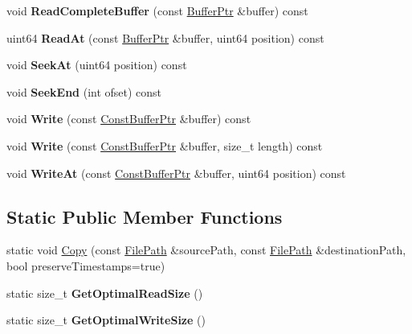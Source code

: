 \begin{DoxyCompactItemize}
void {\bfseries Read\+Complete\+Buffer} (const \hyperlink{class_gost_crypt_1_1_buffer_ptr}{Buffer\+Ptr} \&buffer) const
\item 
\mbox{\label{class_gost_crypt_1_1_file_ae2c6edb5db50a713be646a93275e07f1}} 
uint64 {\bfseries Read\+At} (const \hyperlink{class_gost_crypt_1_1_buffer_ptr}{Buffer\+Ptr} \&buffer, uint64 position) const
\item 
\mbox{\label{class_gost_crypt_1_1_file_ab758399ba66aaabe579f91941df9c4a4}} 
void {\bfseries Seek\+At} (uint64 position) const
\item 
\mbox{\label{class_gost_crypt_1_1_file_ad9b03bafa2dc71bfbc336ba47ab39563}} 
void {\bfseries Seek\+End} (int ofset) const
\item 
\mbox{\label{class_gost_crypt_1_1_file_a54ade5acfa6a39a7ee1a228a21a62127}} 
void {\bfseries Write} (const \hyperlink{class_gost_crypt_1_1_const_buffer_ptr}{Const\+Buffer\+Ptr} \&buffer) const
\item 
\mbox{\label{class_gost_crypt_1_1_file_a2c4b03b9e9aa46b0893b72a49d83719f}} 
void {\bfseries Write} (const \hyperlink{class_gost_crypt_1_1_const_buffer_ptr}{Const\+Buffer\+Ptr} \&buffer, size\+\_\+t length) const
\item 
\mbox{\label{class_gost_crypt_1_1_file_a08c967dac3fea5e47c5eaed62cc53b34}} 
void {\bfseries Write\+At} (const \hyperlink{class_gost_crypt_1_1_const_buffer_ptr}{Const\+Buffer\+Ptr} \&buffer, uint64 position) const
\end{DoxyCompactItemize}
\subsection*{Static Public Member Functions}
\begin{DoxyCompactItemize}
\item 
static void \hyperlink{class_gost_crypt_1_1_file_af83c4a46f6c48088605b98e6b08d162f}{Copy} (const \hyperlink{class_gost_crypt_1_1_filesystem_path}{File\+Path} \&source\+Path, const \hyperlink{class_gost_crypt_1_1_filesystem_path}{File\+Path} \&destination\+Path, bool preserve\+Timestamps=true)
\item 
\mbox{\label{class_gost_crypt_1_1_file_a2b044c5b0a901e7ec057b7d3e43009ff}} 
static size\+\_\+t {\bfseries Get\+Optimal\+Read\+Size} ()
\item 
\mbox{\label{class_gost_crypt_1_1_file_aeaecdc0cffd4e85b823b15488c3ecaf6}} 
static size\+\_\+t {\bfseries Get\+Optimal\+Write\+Size} ()
\end{DoxyCompactItemize}
